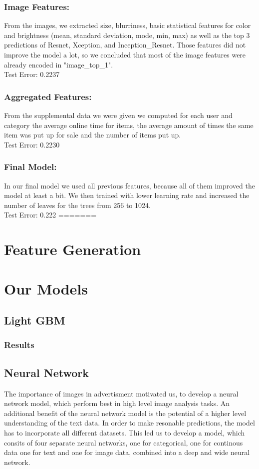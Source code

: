 \documentclass[runningheads]{llncs}
\begin{document}
\subsubsection{Image Features:} From the images, we extracted size, blurriness, basic statistical features for color and brightness (mean, standard deviation, mode, min, max) as well as the top 3 predictions of Resnet, Xception, and Inception\_Resnet. Those features did not improve the model a lot, so we concluded that most of the image features were already encoded in "image\_top\_1".\\
Test Error: 0.2237 
\subsubsection{Aggregated Features:} From the supplemental data we were given we computed for each user and category the average online time for items, the average amount of times the same item was put up for sale and the number of items put up.\\
Test Error: 0.2230
\subsubsection{Final Model:} In our final model we used all previous features, because all of them improved the model at least a bit. We then trained with lower learning rate and increased the number of leaves for the trees from 256 to 1024.\\
Test Error: 0.222
=======
 \section{Feature Generation}
 \section{Our Models}
 \subsection{Light GBM}
 \subsubsection{Results}
 \subsection{Neural Network}
 The importance of images in advertisment motivated us, to develop a neural network model, which perform best in high level image analysis tasks. An additional benefit of the neural network model is the potential of a higher level understanding of the text data. In order to make resonable predictions, the model has to incorporate all different datasets. This led us to develop a  model, which consits of four separate neural networks, one for categorical, one for continous data one for text and one for image data, combined into a deep and wide neural network.
\end{document}
